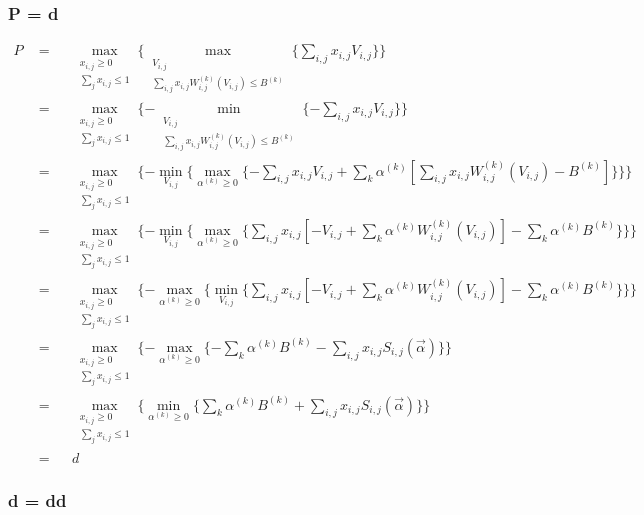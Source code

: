 \documentclass[sigconf]{acmart}
\newcommand{\sumj}{\sum\limits_j}
\newcommand{\sumk}{\sum\limits_k}
\newcommand{\sumij}{\sum\limits_{i,j}}
\newcommand{\sx}{x_{i,j}}
\newcommand{\sV}{V_{i,j}}
\newcommand{\sW}{W_{i,j}^{(k)}}
\newcommand{\sB}{B^{(k)}}
\newcommand{\salpha}{\alpha^{(k)}}
\newcommand{\sS}{S_{i,j}}
\newcommand{\valpha}{\vec{\alpha}}
\newcommand{\agapresourceconstraint}{\sumij \sx \sW(\sV) \le \sB}
\newcommand{\assignmentconstraint}{\sumj \sx \le 1}
\begin{document}
\subsubsection{P = d}

\begin{align*}
    P     & = &&
        \max\limits_{\substack{ \sx \ge 0 \\ \assignmentconstraint }} \{
        \max\limits_{\substack{ \sV \\ \agapresourceconstraint }} \{
        \sumij \sx \sV \} \} \\
    \quad & = &&
        \max\limits_{\substack{ \sx \ge 0 \\ \assignmentconstraint }} \{
        - \min\limits_{\substack{ \sV \\ \agapresourceconstraint }} \{
        - \sumij \sx \sV \} \} \\
    \quad & = &&
        \max\limits_{\substack{ \sx \ge 0 \\ \assignmentconstraint }} \{
        - \min\limits_{\sV} \{ \max\limits_{\salpha \ge 0} \{
        - \sumij \sx \sV + \sumk \salpha [\sumij \sx \sW(\sV) - B^{(k)}] \} \} \} \\
    \quad & = &&
        \max\limits_{\substack{ \sx \ge 0 \\ \assignmentconstraint }} \{
        - \min\limits_{\sV} \{ \max\limits_{\salpha \ge 0} \{
        \sumij \sx [-\sV + \sumk \salpha \sW(\sV)] - \sumk \salpha B^{(k)} \} \} \} \\
    \quad & = &&
        \max\limits_{\substack{ \sx \ge 0 \\ \assignmentconstraint }} \{
        - \max\limits_{\salpha \ge 0} \{ \min\limits_{\sV} \{
        \sumij \sx [-\sV + \sumk \salpha \sW(\sV)] - \sumk \salpha B^{(k)} \} \} \} \\
    \quad & = &&
        \max\limits_{\substack{ \sx \ge 0 \\ \assignmentconstraint }} \{
        - \max\limits_{\salpha \ge 0} \{ - \sumk \salpha \sB - \sumij \sx \sS(\valpha) \} \} \\
    \quad & = &&
        \max\limits_{\substack{ \sx \ge 0 \\ \assignmentconstraint }} \{
        \min\limits_{\salpha \ge 0} \{ \sumk \salpha \sB + \sumij \sx \sS(\valpha) \} \} \\
    \quad & = && d
\end{align*}

\subsubsection{d = dd}
\end{document}
